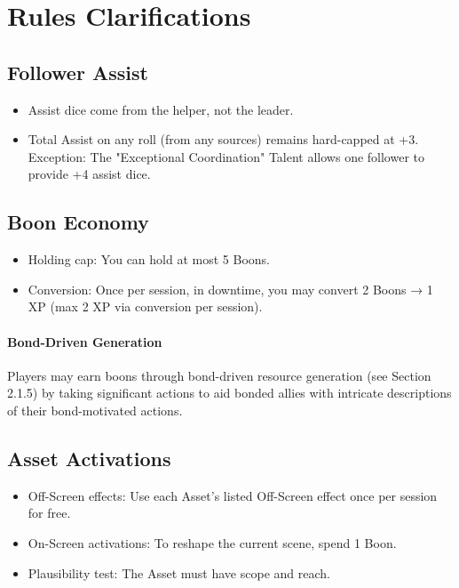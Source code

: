 \documentclass[11pt]{article}
\begin{document}
\section{Rules Clarifications}

\subsection{Follower Assist}
\begin{itemize}
    \item Assist dice come from the helper, not the leader.
    \item Total Assist on any roll (from any sources) remains hard-capped at +3. Exception: The "Exceptional Coordination" Talent allows one follower to provide +4 assist dice.
\end{itemize}

\subsection{Boon Economy}
\begin{itemize}
    \item Holding cap: You can hold at most 5 Boons.
    \item Conversion: Once per session, in downtime, you may convert 2 Boons → 1 XP (max 2 XP via conversion per session).
\end{itemize}

\paragraph{Bond-Driven Generation}
Players may earn boons through bond-driven resource generation (see Section 2.1.5) by taking significant actions to aid bonded allies with intricate descriptions of their bond-motivated actions.

\subsection{Asset Activations}
\begin{itemize}
    \item Off-Screen effects: Use each Asset's listed Off-Screen effect once per session for free.
    \item On-Screen activations: To reshape the current scene, spend 1 Boon.
    \item Plausibility test: The Asset must have scope and reach.
\end{itemize}
\end{document}
